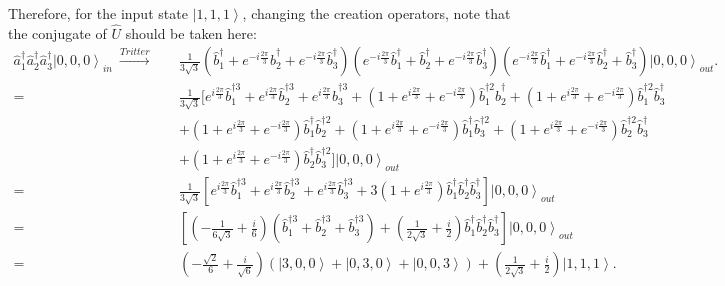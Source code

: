 \documentclass[%
 reprint,
 amsmath,amssymb,
 aps,
onecolumn
]{revtex4-2}
\begin{document}
Therefore, for the input state $\left|1,1,1\right\rangle$,
changing the creation operators, note that the conjugate of 
$\hat{U}$ should be taken here:
\begin{eqnarray}
  \hat{a}_1^\dagger\hat{a}_2^\dagger\hat{a}_3^\dagger 
  \left|0,0,0\right\rangle_{in} 
  ~\xrightarrow{Tritter}~&&
  \frac{1}{3\sqrt{3}}
  \left(
    \hat{b}_1^\dagger + e^{-i\frac{2\pi}{3}}\hat{b}_2^\dagger +
    e^{-i\frac{2\pi}{3}}\hat{b}_3^\dagger
  \right)
  \left(
    e^{-i\frac{2\pi}{3}}\hat{b}_1^\dagger + \hat{b}_2^\dagger +
    e^{-i\frac{2\pi}{3}}\hat{b}_3^\dagger
  \right)
  \left(
    e^{-i\frac{2\pi}{3}}\hat{b}_1^\dagger + 
    e^{-i\frac{2\pi}{3}}\hat{b}_2^\dagger + \hat{b}_3^\dagger
  \right)
  \left|0,0,0\right\rangle_{out}. \nonumber \\
  =&&\frac{1}{3\sqrt{3}}
  \biggl[
    e^{i\frac{2\pi}{3}}\hat{b}_1^{\dagger 3} + 
    e^{i\frac{2\pi}{3}}\hat{b}_2^{\dagger 3} +
    e^{i\frac{2\pi}{3}}\hat{b}_3^{\dagger 3} +
    \left(1+e^{i\frac{2\pi}{3}}+e^{-i\frac{2\pi}{3}}\right)
    \hat{b}_1^{\dagger 2} \hat{b}_2^{\dagger} +
    \left(1+e^{i\frac{2\pi}{3}}+e^{-i\frac{2\pi}{3}}\right)
    \hat{b}_1^{\dagger 2} \hat{b}_3^{\dagger} \nonumber \\ &&+
    \left(1+e^{i\frac{2\pi}{3}}+e^{-i\frac{2\pi}{3}}\right)
    \hat{b}_1^{\dagger} \hat{b}_2^{\dagger 2} +
    \left(1+e^{i\frac{2\pi}{3}}+e^{-i\frac{2\pi}{3}}\right)
    \hat{b}_1^{\dagger} \hat{b}_3^{\dagger 2} +
    \left(1+e^{i\frac{2\pi}{3}}+e^{-i\frac{2\pi}{3}}\right)
    \hat{b}_2^{\dagger 2} \hat{b}_3^{\dagger} \nonumber \\ &&+
    \left(1+e^{i\frac{2\pi}{3}}+e^{-i\frac{2\pi}{3}}\right)
    \hat{b}_2^{\dagger} \hat{b}_3^{\dagger 2}
  \biggr]
  \left|0,0,0\right\rangle_{out} \nonumber  \\
  =&& \frac{1}{3\sqrt{3}}
  \left[
    e^{i\frac{2\pi}{3}}\hat{b}_1^{\dagger 3} + 
    e^{i\frac{2\pi}{3}}\hat{b}_2^{\dagger 3} +
    e^{i\frac{2\pi}{3}}\hat{b}_3^{\dagger 3} +
    3\left(1+e^{i\frac{2\pi}{3}}\right)\hat{b}_1^\dagger
    \hat{b}_2^\dagger\hat{b}_3^\dagger
  \right]
  \left|0,0,0\right\rangle_{out} \nonumber \\
  =&&
  \left[
    \left(-\frac{1}{6\sqrt{3}}+\frac{i}{6}\right)
    \left( \hat{b}_1^{\dagger 3} + \hat{b}_2^{\dagger 3} +
    \hat{b}_3^{\dagger 3} \right) +
    \left(\frac{1}{2\sqrt{3}}+\frac{i}{2}\right)
    \hat{b}_1^\dagger\hat{b}_2^\dagger\hat{b}_3^\dagger
  \right]
  \left|0,0,0\right\rangle_{out} \nonumber \\
  =&& 
  \left(-\frac{\sqrt{2}}{6}+\frac{i}{\sqrt{6}}\right)
  \left(
    \left|3,0,0\right\rangle+\left|0,3,0\right\rangle+
    \left|0,0,3\right\rangle
  \right) +
  \left(\frac{1}{2\sqrt{3}}+\frac{i}{2}\right)
  \left|1,1,1\right\rangle.
\end{eqnarray}          
\end{document}
